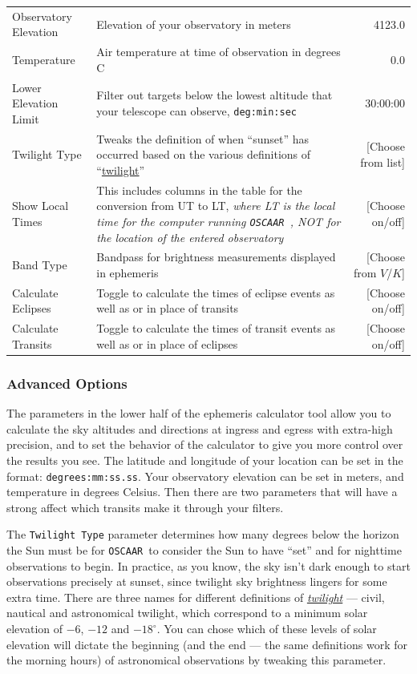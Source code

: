\documentclass[a4paper]{article}
\newcommand{\code}[1]{\texttt{#1}}
\newcommand{\oscaar}{\code{OSCAAR}~}
\begin{document}
\begin{table}[H]
\begin{tabular}{p{0.8in} |  p{3.2in} r}
Observatory Elevation & Elevation of your observatory in meters & 4123.0 \\
Temperature & Air temperature at time of observation in degrees C & 0.0 \\
Lower Elevation Limit & Filter out targets below the lowest altitude that your telescope can observe, \code{deg:min:sec} & 30:00:00 \\
Twilight Type & Tweaks the definition of when ``sunset'' has occurred based on the various definitions of ``\href{http://en.wikipedia.org/wiki/Twilight#Definitions}{twilight}'' & [Choose from list] \\
Show Local Times & This includes columns in the table for the conversion from UT to LT, \textit{where LT is the local time for the computer running \oscaar, NOT for the location of the entered observatory} & [Choose on/off] \\
Band Type & Bandpass for brightness measurements displayed in ephemeris &  [Choose from $V$/$K$]\\
Calculate Eclipses & Toggle to calculate the times of eclipse events as well as or in place of transits &  [Choose on/off]\\
Calculate Transits & Toggle to calculate the times of transit events as well as or in place of eclipses &  [Choose on/off]\\
\hline 
\end{tabular}
\end{table}

\pagebreak

\subsubsection{Advanced Options}

The parameters in the lower half of the ephemeris calculator tool allow you to calculate the sky altitudes and directions at ingress and egress with extra-high precision, and to set the behavior of the calculator to give you more control over the results you see. The latitude and longitude of your location can be set in the format: \code{degrees:mm:ss.ss}. Your observatory elevation can be set in meters, and temperature in degrees Celsius. Then there are two parameters that will have a strong affect which transits make it through your filters. 

The \code{Twilight Type} parameter determines how many degrees below the horizon the Sun must be for \oscaar to consider the Sun to have ``set'' and for nighttime observations to begin. In practice, as you know, the sky isn't dark enough to start observations precisely at sunset, since twilight sky brightness lingers for some extra time. There are three names for different definitions of \href{http://en.wikipedia.org/wiki/Twilight#Definitions}{\textit{twilight}} --- civil, nautical and astronomical twilight, which correspond to a minimum solar elevation of $-6$, $-12$ and $-18^{\circ}$. You can chose which of these levels of solar elevation will dictate the beginning (and the end --- the same definitions work for the morning hours) of astronomical observations by tweaking this parameter. 
\end{document}
